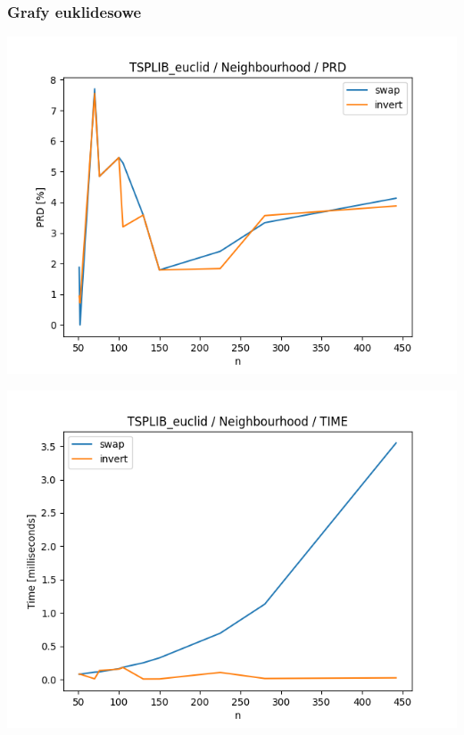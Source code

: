 \documentclass{article}
\begin{document}
\subsubsection{Grafy euklidesowe}

\begin{center}
\includegraphics[width=\textwidth, 
                   height = 0.4\textheight, 
                   keepaspectratio]
                  {plots/neighbours_tsplib_euclid_prd} 
\end{center}

\begin{center}
\includegraphics[width=\textwidth, 
                   height = 0.4\textheight, 
                   keepaspectratio]
                  {plots/neighbours_tsplib_euclid_time} 
\end{center}
\end{document}
